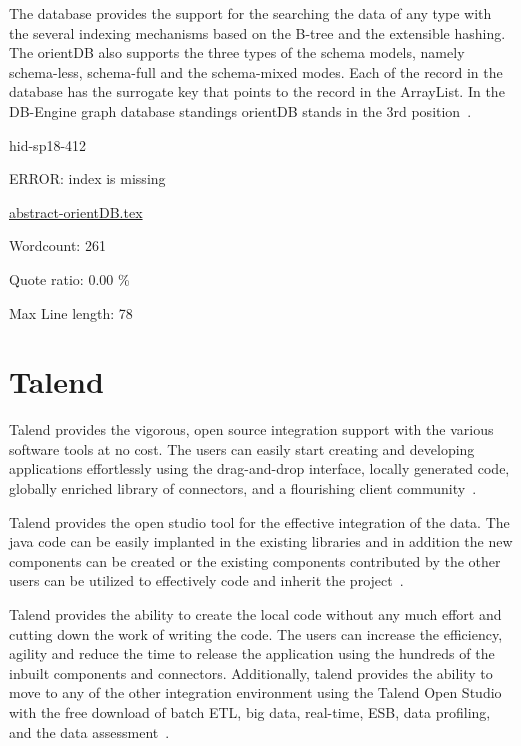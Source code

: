 The database provides the support for the searching
the data of any type with the several indexing mechanisms based on the
B-tree and the extensible hashing. The orientDB also supports the three 
types of the schema models, namely schema-less, schema-full and the 
schema-mixed modes. Each of the record in the database has the 
surrogate key that points to the record in the ArrayList. In the DB-Engine 
graph database standings orientDB stands 
in the 3rd position~\cite{hid-sp18-412-orientDB_wiki}.








\begin{IU}

hid-sp18-412

ERROR: index is missing

\href{https://github.com/cloudmesh-community/hid-sp18-412/blob/master//technology/abstract-orientDB.tex}{abstract-orientDB.tex}

 

Wordcount: 261


Quote ratio: 0.00 \%
 
Max Line length: 78
\end{IU}

\section{Talend}
Talend provides the vigorous, open source integration support with the various
software tools at no cost. The users can easily start creating and developing
applications effortlessly using the drag-and-drop interface, locally generated
code, globally enriched library of connectors, and a flourishing client
community~\cite{hid-sp18-412-talend_products}.

Talend provides the open studio tool for the effective integration of the data.
 The java code can be easily implanted in the existing libraries and in
addition the new components can be created or the existing components
contributed by the other users can be utilized to effectively code and
inherit the project~\cite{hid-sp18-412-talend_open_studio}.

Talend provides the ability to create the local code without any much effort
and cutting down the work of writing the code.
The users can increase the efficiency, agility and
reduce the time to release the application using the hundreds of the
inbuilt components and connectors. Additionally, talend provides the
ability to move to any of the other integration environment using the
Talend Open Studio with the free download of batch ETL, big data, real-time,
ESB, data profiling, and
the data assessment~\cite{hid-sp18-412-talend_products}.

